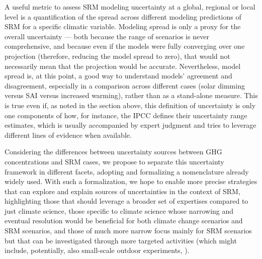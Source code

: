 \documentclass[draft]{agujournal2019}
\begin{document}
A useful metric to assess SRM modeling uncertainty at a global, regional or local level is a quantification of the spread across different modeling predictions of SRM for a specific climatic variable. Modeling spread is only a proxy for the overall uncertainty --- both because the range of scenarios is never comprehensive, and because even if the models were fully converging over one projection (therefore, reducing the model spread to zero), that would not necessarily mean that the projection would be accurate. Nevertheless, model spread is, at this point, a good way to understand models' agreement and disagreement, especially in a comparison across different cases (solar dimming versus SAI versus increased warming), rather than as a stand-alone measure. This is true even if, as noted in the section above, this definition of uncertainty is only one components of how, for instance, the IPCC defines their uncertainty range estimates, which is usually accompanied by expert judgment and tries to leverage different lines of evidence when available.

Considering the differences between uncertainty sources between GHG concentrations and SRM cases, we propose to separate this uncertainty framework in different facets, adopting and formalizing a nomenclature already widely used. With such a formalization, we hope to enable more precise strategies that can explore and explain sources of uncertainties in the context of SRM, highlighting those that should leverage a broader set of expertises compared to just climate science, those specific to climate science whose narrowing and eventual resolution would be beneficial for both climate change scenarios and SRM scenarios, and those of much more narrow focus mainly for SRM scenarios but that can be investigated through more targeted activities (which might include, potentially, also small-scale outdoor experiments, ). 
\end{document}
